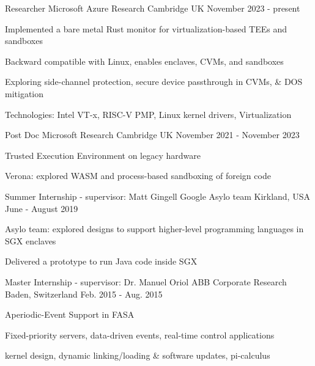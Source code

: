 


\begin{cventries}


\cventry
{Researcher}
{Microsoft Azure Research}
{Cambridge UK}
{November 2023 - present}
{
  \begin{cvitems}
  \item{Implemented a bare metal Rust monitor for virtualization-based TEEs and sandboxes}
  \item{Backward compatible with Linux, enables enclaves, CVMs, and sandboxes}
  \item{Exploring side-channel protection, secure device passthrough in CVMs, \& DOS mitigation}
  \item{Technologies: Intel VT-x, RISC-V PMP, Linux kernel drivers, Virtualization}
  \end{cvitems}
}

\cventry
{Post Doc}
{Microsoft Research}
{Cambridge UK}
{November 2021 - November 2023}
{
  \begin{cvitems}
  \item{Trusted Execution Environment on legacy hardware}
  \item{Verona: explored WASM and process-based sandboxing of foreign code}
  \end{cvitems}
}

\cventry
{Summer Internship - supervisor: Matt Gingell}
{Google Asylo team}
{Kirkland, USA}
{June - August 2019}
{ 
  \begin{cvitems}
	\item{Asylo team: explored designs to support higher-level programming languages in SGX enclaves}
  \item{Delivered a prototype to run Java code inside SGX}
	\end{cvitems}
}

\cventry
{Master Internship - supervisor: Dr. Manuel Oriol}
{ABB Corporate Research}
{Baden, Switzerland}
{Feb. 2015 - Aug. 2015}
{
	\begin{cvitems}
  \item{Aperiodic-Event Support in FASA}
  \item{Fixed-priority servers, data-driven events, real-time control applications}
  \item{kernel design, dynamic linking/loading \& software updates, pi-calculus}
	\end{cvitems}
}

\end{cventries}
